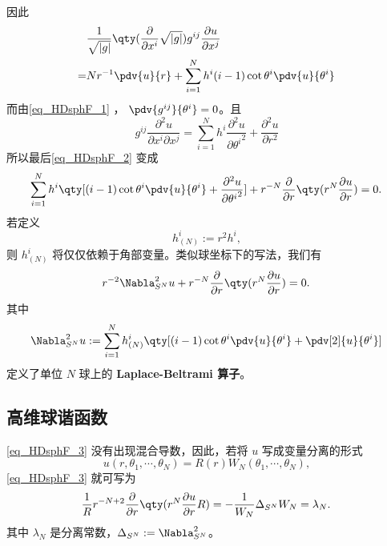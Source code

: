 因此
\begin{equation}
\begin{aligned}
&\frac{1}{\sqrt{ \left\lvert g \right\rvert }} \qty(\frac{\partial }{\partial x^i} \sqrt{ \left\lvert g \right\rvert })g^{ij} \frac{\partial u}{\partial x^j}\\
=&Nr^{-1}\pdv{u}{r}+\sum_{i=1}^{N}h^{i}(i-1)\cot\theta^i\pdv{u}{\theta^i}\\
\end{aligned}~
\end{equation}
而由\autoref{eq_HDsphF_1} ， $\pdv{g^{ij}}{\theta^i}=0$。且
\begin{equation}
g^{ij}\frac{\partial^2 u}{\partial x^i\partial x^j}=\sum_{i=1}^{N}h^{i}\frac{\partial^2 u}{\partial {\theta^i}^2}+\frac{\partial^2 u}{\partial r^2}~
\end{equation}
所以最后\autoref{eq_HDsphF_2} 变成
\begin{equation}
\begin{aligned}
\sum_{i=1}^{N}h^{i}\qty[(i-1)\cot\theta^i\pdv{u}{\theta^i}+\frac{\partial^2 u}{\partial {\theta^i}^2}]+r^{-N}\frac{\partial }{\partial r}\qty(r^{N}\frac{\partial u}{\partial r})=0.
\end{aligned}~
\end{equation}
若定义 
\begin{equation}\label{eq_HDsphF_6}
h^i_{(N)}:=r^2h^i,~
\end{equation}
则 $h^i_{(N)}$ 将仅仅依赖于角部变量。类似球坐标下的写法，我们有
\begin{equation}\label{eq_HDsphF_3}
r^{-2}\Nabla^{2}_{S^N}u+r^{-N}\frac{\partial }{\partial r}\qty(r^{N}\frac{\partial u}{\partial r})=0.~
\end{equation}
其中
\begin{equation}\label{eq_HDsphF_5}
\Nabla^{2}_{S^N}u:=\sum_{i=1}^N h^{i}_{(N)}\qty[(i-1)\cot\theta^i\pdv{u}{\theta^i}+\pdv[2]{u}{\theta^i}]~
\end{equation}
定义了单位 $N$ 球上的 \textbf{Laplace-Beltrami 算子}。
\subsection{高维球谐函数}
\autoref{eq_HDsphF_3} 没有出现混合导数，因此，若将 $u$ 写成变量分离的形式
\begin{equation}
u(r,\theta_1,\cdots,\theta_N)=R(r)W_N(\theta_1,\cdots,\theta_N),~
\end{equation}
\autoref{eq_HDsphF_3} 就可写为
\begin{equation}\label{eq_HDsphF_4}
\frac{1}{R}r^{-N+2}\frac{\partial }{\partial r}\qty(r^{N}\frac{\partial u}{\partial r}R)=-\frac{1}{W_N}\Delta_{S^N}W_N=\lambda_N.~
\end{equation}
其中 $\lambda_N$ 是分离常数，$\Delta_{S^N}:=\Nabla_{S^N}^2$。

